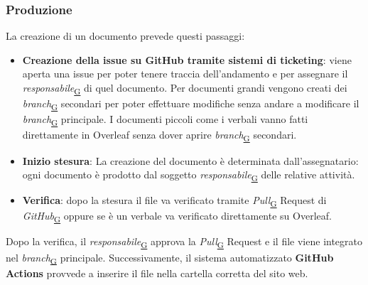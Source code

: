 \documentclass[a4paper,12pt]{article}
\begin{document}
    \subsubsection{Produzione}
    \label{subsubsec:prod}
        La creazione di un documento prevede questi passaggi:
        \begin{itemize}
            \item \textbf{Creazione della issue su GitHub tramite sistemi di ticketing}: viene aperta una issue per poter tenere traccia dell'andamento e per assegnare il \textit{responsabile}\textsubscript{\href{https://atlasteam9.github.io/Atlas/glossario.html\#Responsabile}{G}} di quel documento. Per documenti grandi vengono creati dei \textit{branch}\textsubscript{\href{https://atlasteam9.github.io/Atlas/glossario.html\#Branch}{G}} secondari per poter effettuare modifiche senza andare a modificare il \textit{branch}\textsubscript{\href{https://atlasteam9.github.io/Atlas/glossario.html\#Branch}{G}} principale. I documenti piccoli come i verbali vanno fatti direttamente in Overleaf senza dover aprire \textit{branch}\textsubscript{\href{https://atlasteam9.github.io/Atlas/glossario.html\#Branch}{G}} secondari.
            \item \textbf{Inizio stesura}: La creazione del documento è determinata dall'assegnatario: ogni documento è prodotto dal soggetto \textit{responsabile}\textsubscript{\href{https://atlasteam9.github.io/Atlas/glossario.html\#Responsabile}{G}} delle relative attività.
            \item \textbf{Verifica}: dopo la stesura il file va verificato tramite \textit{Pull}\textsubscript{\href{https://atlasteam9.github.io/Atlas/glossario.html\#Pull}{G}} Request di \textit{GitHub}\textsubscript{\href{https://atlasteam9.github.io/Atlas/glossario.html\#GitHub}{G}} oppure se è un verbale va verificato direttamente su Overleaf.
        \end{itemize}
        Dopo la verifica, il \textit{responsabile}\textsubscript{\href{https://atlasteam9.github.io/Atlas/glossario.html\#Responsabile}{G}} approva la \textit{Pull}\textsubscript{\href{https://atlasteam9.github.io/Atlas/glossario.html\#Pull}{G}} Request e il file viene integrato nel \textit{branch}\textsubscript{\href{https://atlasteam9.github.io/Atlas/glossario.html\#Branch}{G}} principale. Successivamente, il sistema automatizzato \textbf{GitHub Actions} provvede a inserire il file nella cartella corretta del sito web.
    
\end{document}
